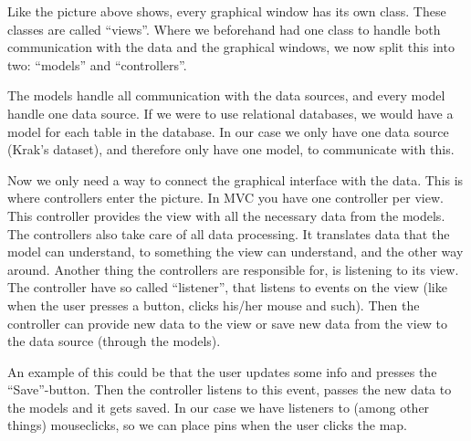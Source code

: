 Like the picture above shows, every graphical window has its own class. These
classes are called ``views''. Where we beforehand had one class to handle both
communication with the data and the graphical windows, we now split this into
two: ``models'' and ``controllers''.

The models handle all communication with the data sources, and every model
handle one data source. If we were to use relational databases, we would have a
model for each table in the database. In our case we only have one data source
(Krak's dataset), and therefore only have one model, to communicate with this.

Now we only need a way to connect the graphical interface with the data. This is
where controllers enter the picture. In MVC you have one controller per view.
This controller provides the view with all the necessary data from the models. 
The controllers also take care of all data processing. It translates data that the 
model can understand, to something the view can understand, and the other 
way around. Another thing the controllers are responsible for, is listening to its view. 
The controller have so called ``listener'', that listens to events on the view (like when 
the user presses a button, clicks his/her mouse and such). Then the controller can 
provide new data to the view or save new data from the view to the data source 
(through the models).

An example of this could be that the user updates some info and presses the 
``Save''-button. Then the controller listens to this event, passes the new data
to the models and it gets saved.
In our case we have listeners to (among other things) mouseclicks, so we can
place pins when the user clicks the map.